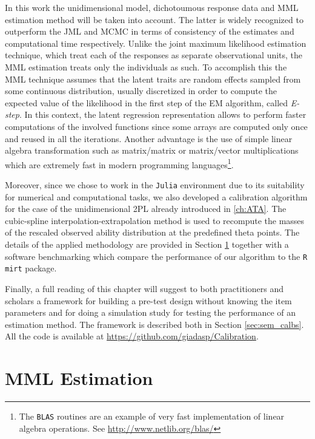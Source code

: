 In this work the unidimensional model, dichotoumous response data and MML estimation method will be taken into account. The latter is widely recognized to outperform the JML and MCMC in terms of consistency of the estimates \parencite{andersen1977sufficient, neyman1948consistent} and computational time  \parencite{patz1999applications} respectively. Unlike the joint maximum likelihood estimation technique, which treat each of the responses as separate observational units, the MML estimation treats only the individuals as such. To accomplish this the MML technique assumes that the latent traits are random effects sampled from some continuous distribution, usually discretized in order to compute the expected value of the likelihood in the first step of the EM algorithm, called \emph{E-step}. In this context, the latent regression representation allows to perform faster computations of the involved functions since some arrays are computed only once and reused in all the iterations. Another advantage is the use of simple linear algebra transformation such as matrix/matrix or matrix/vector multiplications which are extremely fast in modern programming languages\footnote{The \texttt{BLAS} routines are an example of very fast implementation of linear algebra operations. See  \url{http://www.netlib.org/blas/}}. 

Moreover, since we chose to work in the \texttt{Julia} environment due to its suitability for numerical and computational tasks, we also developed a calibration algorithm for the case of the unidimensional 2PL already introduced in \ref{ch:ATA}. The cubic-spline interpolation-extrapolation method \parencite{birkhoff1960smooth} is used to recompute the masses of the rescaled observed ability distribution at the predefined theta points. The details of the applied methodology are provided in Section \ref{sec:estimation} together with a software benchmarking which compare the performance of our algorithm to the \texttt{R} \texttt{mirt} package.

Finally, a full reading of this chapter will suggest to both practitioners and scholars a framework for building a pre-test design without knowing the item parameters and for doing a simulation study for testing the performance of an estimation method. The framework is described both in Section \ref{sec:sem_calbs}. All the code is available at \url{https://github.com/giadasp/Calibration}.


\section{MML Estimation}\label{sec:estimation}

